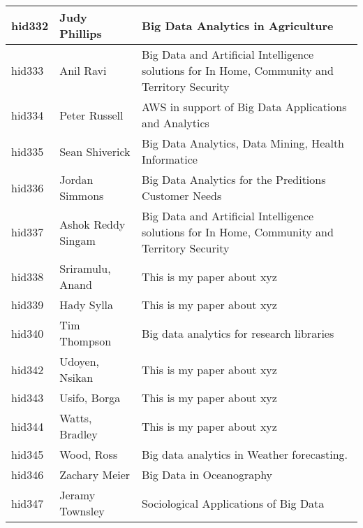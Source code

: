 \documentclass[12pt]{article}
\begin{document}
\begin{footnotesize}
\begin{longtable}{|p{1cm}p{5cm}p{9cm}|}
\hline
hid332 & Judy Phillips & Big Data Analytics in Agriculture  \\
\hline
hid333 & Anil Ravi & Big Data and Artificial Intelligence solutions for In Home, Community and Territory Security  \\
\hline
hid334 & Peter Russell & AWS in support of Big Data Applications and Analytics  \\
\hline
hid335 & Sean Shiverick & Big Data Analytics, Data Mining, Health Informatice  \\
\hline
hid336 & Jordan Simmons & Big Data Analytics for the Preditions Customer Needs  \\
\hline
hid337 & Ashok Reddy Singam & Big Data and Artificial Intelligence solutions for In Home, Community and Territory Security  \\
\hline
hid338 & Sriramulu, Anand & This is my paper about xyz  \\
\hline
hid339 & Hady Sylla & This is my paper about xyz  \\
\hline
hid340 & Tim Thompson & Big data analytics for research libraries  \\
\hline
hid342 & Udoyen, Nsikan & This is my paper about xyz  \\
\hline
hid343 & Usifo, Borga & This is my paper about xyz  \\
\hline
hid344 & Watts, Bradley & This is my paper about xyz  \\
\hline
hid345 & Wood, Ross & Big data analytics in Weather forecasting.  \\
\hline
hid346 & Zachary Meier & Big Data in Oceanography  \\
\hline
hid347 & Jeramy Townsley & Sociological Applications of Big Data  \\
\hline
\end{longtable}
\end{footnotesize}
\newpage
\end{document}
